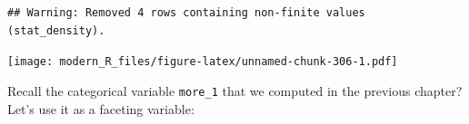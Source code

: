 \documentclass[]{gitbook}
\newenvironment{Shaded}{\begin{snugshade}}{\end{snugshade}}
\newcommand{\DataTypeTok}[1]{\textcolor[rgb]{0.13,0.29,0.53}{#1}}
\newcommand{\KeywordTok}[1]{\textcolor[rgb]{0.13,0.29,0.53}{\textbf{#1}}}
\newcommand{\NormalTok}[1]{#1}
\newcommand{\OperatorTok}[1]{\textcolor[rgb]{0.81,0.36,0.00}{\textbf{#1}}}
\newcommand{\StringTok}[1]{\textcolor[rgb]{0.31,0.60,0.02}{#1}}
\theoremstyle{definition}
\theoremstyle{definition}
\theoremstyle{definition}
\theoremstyle{remark}
\begin{document}
\begin{Shaded}
\end{Shaded}

\begin{verbatim}
## Warning: Removed 4 rows containing non-finite values (stat_density).
\end{verbatim}

\texttt{[image: modern\_R\_files/figure-latex/unnamed-chunk-306-1.pdf]}

Recall the categorical variable \texttt{more\_1} that we computed in the
previous chapter? Let's use it as a faceting variable:
\end{document}
